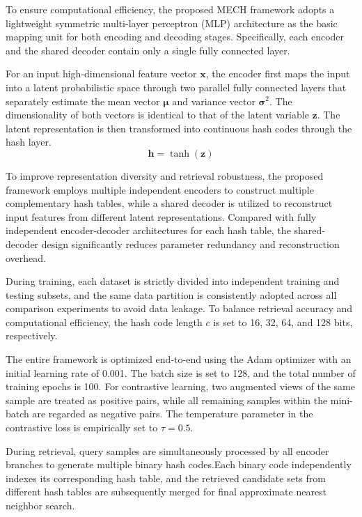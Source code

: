 \documentclass[conference]{IEEEtran}
\begin{document}
To ensure computational efficiency, the proposed MECH framework adopts a lightweight symmetric multi-layer perceptron (MLP) architecture as the basic mapping unit for both encoding and decoding stages. Specifically, each encoder and the shared decoder contain only a single fully connected layer.

For an input high-dimensional feature vector $\mathbf{x}$, the encoder first maps the input into a latent probabilistic space through two parallel fully connected layers that separately estimate the mean vector $\boldsymbol{\mu}$ and variance vector $\boldsymbol{\sigma}^2$. The dimensionality of both vectors is identical to that of the latent variable $\mathbf{z}$. The latent representation is then transformed into continuous hash codes through the hash layer.
\[
\mathbf{h} = \tanh(\mathbf{z})
\]


To improve representation diversity and retrieval robustness, the proposed framework employs multiple independent encoders to construct multiple complementary hash tables, while a shared decoder is utilized to reconstruct input features from different latent representations. Compared with fully independent encoder-decoder architectures for each hash table, the shared-decoder design significantly reduces parameter redundancy and reconstruction overhead.

During training, each dataset is strictly divided into independent training and testing subsets, and the same data partition is consistently adopted across all comparison experiments to avoid data leakage. To balance retrieval accuracy and computational efficiency, the hash code length $c$ is set to 16, 32, 64, and 128 bits, respectively.

The entire framework is optimized end-to-end using the Adam optimizer with an initial learning rate of 0.001. The batch size is set to 128, and the total number of training epochs is 100. For contrastive learning, two augmented views of the same sample are treated as positive pairs, while all remaining samples within the mini-batch are regarded as negative pairs. The temperature parameter in the contrastive loss is empirically set to $\tau = 0.5$.

During retrieval, query samples are simultaneously processed by all encoder branches to generate multiple binary hash codes.Each binary code independently indexes its corresponding hash table, and the retrieved candidate sets from different hash tables are subsequently merged for final approximate nearest neighbor search.
\end{document}
